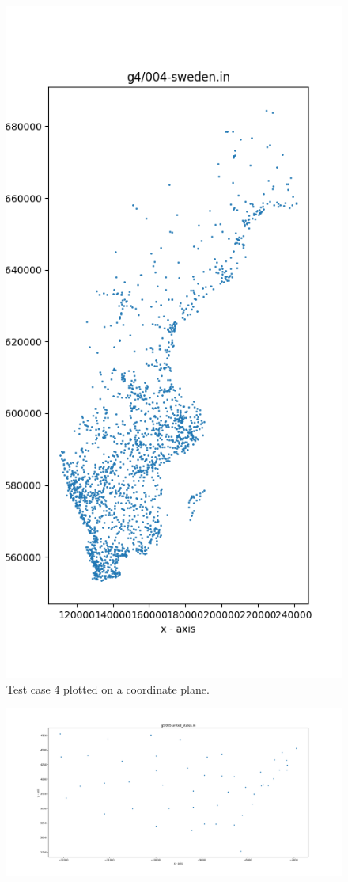 \documentclass{article}
\begin{document}
\begin{appendices}
\begin{figure}[H]
	\includegraphics[scale=0.7]{code/visualizer/testdata/04.png}
	\caption{Test case 4 plotted on a coordinate plane.}
	\label{fig:04}
\end{figure}
\begin{figure}[H]
	\centering
	\includegraphics[scale=0.4]{code/visualizer/testdata/05.png}

\end{figure}
\end{appendices}
\end{document}
